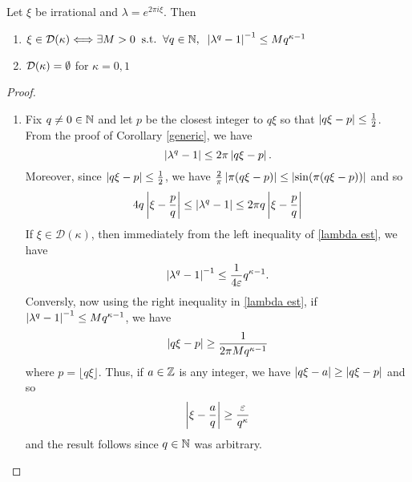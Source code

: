 \documentclass[../main.tex]{subfiles}
\begin{document}
\begin{lem} \label{lem:dioph-asymp} Let $\xi$ be irrational and $\lambda = e^{2\pi i \xi}$. Then
\begin{enumerate}
    \item $\xi \in \mathcal{D}(\kappa) \Longleftrightarrow \exists M > 0\;\; \text{s.t.}\;\; \forall q \in \mathbb{N},\;\; \left|\lambda^{q} - 1\right|^{-1} \leq Mq^{\kappa - 1}$
    \item $\mathcal{D}(\kappa) = \emptyset$ for $\kappa = 0, 1$
\end{enumerate}
\end{lem}
\begin{proof}
\begin{enumerate}
    \item Fix $q \neq 0 \in \mathbb{N}$ and let $p$ be the closest integer to $q\xi$ so that $\left|q\xi - p\right| \leq \frac{1}{2}$. From the proof of Corollary \ref{generic}, we have
    \[
    \left|\lambda^q - 1\right| \leq 2\pi \left|q\xi - p\right|.
    \]
    Moreover, since $\left|q\xi - p\right| \leq \frac{1}{2}$, we have $\frac{2}{\pi} \left|\pi (q\xi - p)\right| \leq \left|\sin(\pi (q\xi - p))\right|$ and so
    \begin{equation}\label{lambda est}
        4q\left|\xi - \frac{p}{q}\right| \leq \left|\lambda^q - 1\right| \leq 2\pi q \left|\xi - \frac{p}{q}\right|
    \end{equation}
    If $\xi \in \mathcal{D}(\kappa)$, then immediately from the left inequality of \eqref{lambda est}, we have
    \[
    \left|\lambda^q - 1\right|^{-1} \leq \frac{1}{4\varepsilon} q^{\kappa - 1}.
    \]
    Conversly, now using the right inequality in \eqref{lambda est}, if $\left|\lambda^q - 1\right|^{-1} \leq Mq^{\kappa - 1}$, we have 
    \[
    \left|q\xi - p\right| \geq \frac{1}{2\pi M q^{\kappa - 1}}
    \]
    where $p = \lfloor q\xi \rfloor$. Thus, if $a \in \mathbb{Z}$ is any integer, we have $ \left|q\xi - a\right| \geq \left|q\xi - p\right|$ and so
    \[
    \left|\xi - \frac{a}{q}\right| \geq \frac{\varepsilon}{q^{\kappa}}
    \]
    and the result follows since $q \in \mathbb{N}$ was arbitrary.
    

\end{enumerate}
\end{proof}
\end{document}
